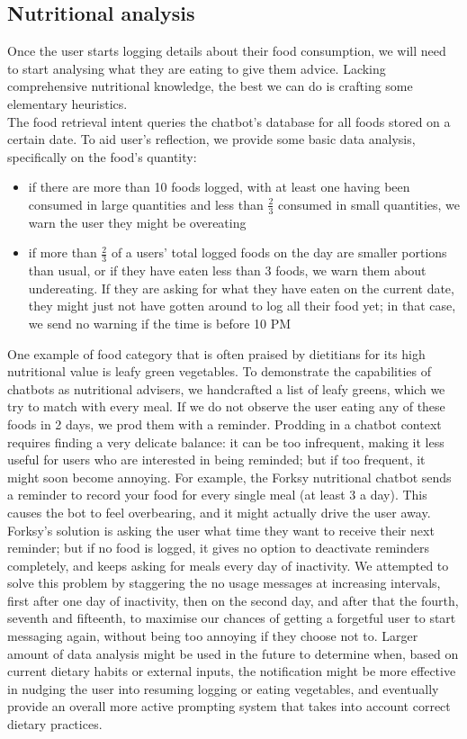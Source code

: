 \subsection{Nutritional analysis}
Once the user starts logging details about their food consumption, we will need to start analysing what they are eating to give them advice. Lacking comprehensive nutritional knowledge, the best we can do is crafting some elementary heuristics. \\
The food retrieval intent queries the chatbot's database for all foods stored on a certain date. To aid user's reflection, we provide some basic data analysis, specifically on the food's quantity: 
\begin{itemize}
\item if there are more than 10 foods logged, with at least one having been consumed in large quantities and less than $\frac{2}{3}$ consumed in small quantities, we warn the user they might be overeating
\item if more than $\frac{2}{3}$ of a users' total logged foods on the day are smaller portions than usual, or if they have eaten less than 3 foods, we warn them about undereating. If they are asking for what they have eaten on the current date, they might just not have gotten around to log all their food yet; in that case, we send no warning if the time is before 10 PM
\end{itemize}
One example of food category that is often praised by dietitians for its high nutritional value \cite{bishoppgreens} is leafy green vegetables. To demonstrate the capabilities of chatbots as nutritional advisers, we handcrafted a list of leafy greens, which we try to match with every meal. If we do not observe the user eating any of these foods in 2 days, we prod them with a reminder. Prodding in a chatbot context requires finding a very delicate balance: it can be too infrequent, making it less useful for users who are interested in being reminded; but if too frequent, it  might soon become annoying. For example, the Forksy nutritional chatbot \cite{forksywebsite} sends a reminder to record your food for every single meal (at least 3 a day). This causes the bot to feel overbearing, and it might actually drive the user away. Forksy's solution is asking the user what time they want to receive their next reminder; but if no food is logged, it gives no option to deactivate reminders completely, and keeps asking for meals every day of inactivity. We attempted to solve this problem by staggering the no usage messages at increasing intervals, first after one day of inactivity, then on the second day, and after that the fourth, seventh and fifteenth, to maximise our chances of getting a forgetful user to start messaging again, without being too annoying if they choose not to. Larger amount of data analysis might be used in the future to determine when, based on current dietary habits or external inputs, the notification might be more effective in nudging the user into resuming logging or eating vegetables, and eventually provide an overall more active prompting system that takes into account correct dietary practices.


